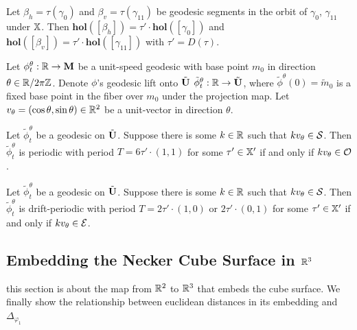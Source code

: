 \documentclass[]{article}
\def\hol{\mathbf{hol}}
\def\bM{\mathbf{M}}
\def\mtild{\tilde{m}_0}
\def\tildphi{\tilde{\phi}}
\begin{document}
\begin{lem}
Let $\beta_h=\tau(\gamma_0)$ and $\beta_v=\tau(\gamma_{11})$ be geodesic segments in the orbit of $\gamma_0$, $\gamma_{11}$ under $\mathbb{X}$. Then $\hol([\beta_h])=\tau'\cdot\hol([\gamma_0])$ and $ \hol([\beta_v])=\tau'\cdot\hol([\gamma_{11}])$ with $\tau'=D(\tau)$. 
\end{lem}

\begin{Def}
Let $\phi_t^\theta:\RR\rightarrow\bM$ be a unit-speed geodesic with base point $m_0$ in direction $\theta\in \mathbb{R}/2\pi\mathbb{Z}$. Denote $\phi$'s geodesic lift onto $\tilde{\mathbf{U}}$ $\tildphi_t^\theta:\RR\rightarrow\btU$, where $\tildphi^\theta(0)=\mtild$ is a fixed base point in the fiber over $m_0$ under the projection map. Let $v_\theta=(\cos\theta,\sin\theta)\in\mathbb{R}^2$ be a unit-vector in direction $\theta$.
\end{Def}

\begin{thm}
Let $\tildphi_t^\theta$ be a geodesic on $\tilde{\mathbf{U}}$. Suppose there is some $k\in\mathbb{R}$ such that $kv_\theta\in\mathcal{S}$. Then $\tildphi_t^\theta$ is periodic with period $T=6\tau'\cdot (1,1)$ for some $\tau'\in\mathbb{X}'$ if and only if $kv_\theta\in\mathcal{O}$.
\end{thm}


\begin{thm}
Let $\tildphi_t^\theta$ be a geodesic on $\tilde{\mathbf{U}}$. Suppose there is some $k\in\mathbb{R}$ such that $kv_\theta\in\mathcal{S}$. Then $\tildphi_t^\theta$ is drift-periodic with period $T=2\tau'\cdot (1,0)$ or $2\tau'\cdot(0,1)$ for some $\tau'\in\mathbb{X}'$ if and only if $kv_\theta\in\mathcal{E}$.
\end{thm}

\subsection{Embedding the Necker Cube Surface in $\mathbb{R}^3$}
this section is about the map from $\mathbb{R}^2$ to $\mathbb{R}^3$ that embeds the cube surface. We finally show the relationship between euclidean distances in its embedding and $\Delta_{\varphi_1}$
\end{document}
